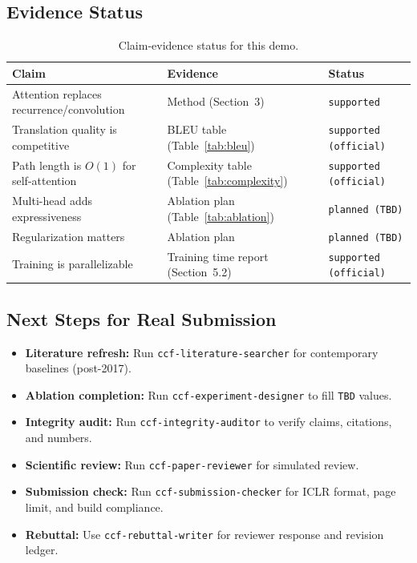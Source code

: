 ﻿\documentclass{article}
\begin{document}
\subsection{Evidence Status}

\begin{table}[h]
 \centering
 \caption{Claim-evidence status for this demo.}
 \small
 \begin{tabular}{P{3.8cm} P{3.5cm} P{3.2cm}}
 \toprule
 Claim & Evidence & Status \\
 \midrule
 Attention replaces recurrence\slash{}convolution & Method (Section~3) & \texttt{supported} \\
 Translation quality is competitive & BLEU table (Table~\ref{tab:bleu}) & \texttt{supported (official)} \\
 Path length is $O(1)$ for self-attention & Complexity table (Table~\ref{tab:complexity}) & \texttt{supported (official)} \\
 Multi-head adds expressiveness & Ablation plan (Table~\ref{tab:ablation}) & \texttt{planned (TBD)} \\
 Regularization matters & Ablation plan & \texttt{planned (TBD)} \\
 Training is parallelizable & Training time report (Section~5.2) & \texttt{supported (official)} \\
 \bottomrule
 \end{tabular}
\end{table}

\subsection{Next Steps for Real Submission}

\begin{itemize}
 \item \textbf{Literature refresh:} Run \texttt{ccf-literature-searcher} for contemporary baselines (post-2017).
 \item \textbf{Ablation completion:} Run \texttt{ccf-experiment-designer} to fill \texttt{TBD} values.
 \item \textbf{Integrity audit:} Run \texttt{ccf-integrity-auditor} to verify claims, citations, and numbers.
 \item \textbf{Scientific review:} Run \texttt{ccf-paper-reviewer} for simulated review.
 \item \textbf{Submission check:} Run \texttt{ccf-submission-checker} for ICLR format, page limit, and build compliance.
 \item \textbf{Rebuttal:} Use \texttt{ccf-rebuttal-writer} for reviewer response and revision ledger.
\end{itemize}
\end{document}
